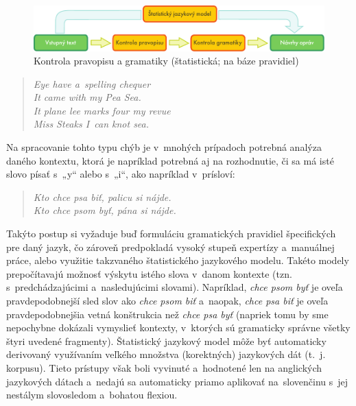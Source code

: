 \begin{multicols}{2}
\begin{figure}[htb]
  \center
  \includegraphics[width=\textwidth]{../_media/slovak/language_checking}
  \caption{Kontrola pravopisu a gramatiky (štatistická; na báze pravidiel)}
  \label{fig:langcheckingaarch_sk}
\end{figure}

\begin{verse}
\emph{%
Eye have a~spelling chequer\\
It came with my Pea Sea.\\
It plane lee marks four my revue\\
Miss Steaks I~can knot sea.
}
\end{verse}

Na spracovanie tohto typu chýb je v~mnohých prípadoch potrebná analýza daného kontextu, ktorá je napríklad potrebná aj na rozhodnutie, či sa má isté slovo písať s~„y“ alebo s~„i“, ako napríklad v~prísloví:

\begin{verse}
\emph{%
Kto chce psa biť, palicu si nájde.\\
\smallskip
Kto chce psom byť, pána si nájde.
}
\end{verse}

Takýto postup si vyžaduje buď formuláciu gramatických
pravidiel špecifických pre daný jazyk, čo zároveň predpokladá
vysoký stupeň expertízy a~manuálnej práce, alebo využitie
takzvaného štatistického jazykového modelu. Takéto
modely prepočítavajú možnosť výskytu istého slova v~danom kontexte
(tzn. s~predchádzajúcimi a~nasledujúcimi slovami). Napríklad,
\emph{chce psom byť} je oveľa pravdepodobnejší sled slov ako
\emph{chce psom biť} a~naopak, \emph{chce psa biť} je oveľa
pravdepodobnejšia vetná konštrukcia než \emph{chce psa byť}
(napriek tomu by sme nepochybne dokázali vymyslieť kontexty,
v~ktorých sú gramaticky správne všetky štyri uvedené fragmenty).
Štatistický jazykový model môže byť automaticky derivovaný
využívaním veľkého množstva (korektných) jazykových dát (t.~j.
korpusu). Tieto prístupy však boli vyvinuté a~hodnotené
len na anglických jazykových dátach a~nedajú sa automaticky priamo
aplikovať na~slovenčinu s~jej nestálym slovosledom a~bohatou flexiou.


\end{multicols}
